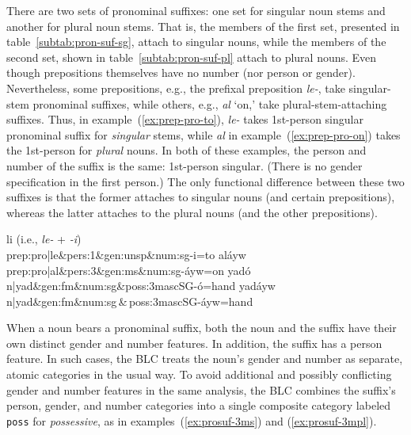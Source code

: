 {\begin{description}
There are two sets
of pronominal suffixes: one set for singular noun stems and another for plural noun stems. 
That is, the members of the first set, presented in table~\ref{subtab:pron-suf-sg}, 
attach to singular nouns, while the members of the second set, shown in table~\ref{subtab:pron-suf-pl} 
attach to plural nouns. 
Even though prepositions themselves have no number (nor person or gender). 
Nevertheless, some prepositions, e.g., the prefixal preposition \textit{le-}, 
take singular-stem pronominal suffixes, while others, e.g., \textit{al} `on,'
take plural-stem-attaching suffixes. Thus, in example~(\ref{ex:prep-pro-to}), 
\textit{le-} takes 1st-person singular pronominal suffix for \emph{singular} stems, 
while \textit{al} in example~(\ref{ex:prep-pro-on}) takes the 1st-person 
for \emph{plural} nouns. In both of these examples, the person and number of 
the suffix is the same: 1st-person singular. (There is no gender specification in the first person.)
The only functional difference between these two suffixes is that the former 
attaches to singular nouns (and certain prepositions), whereas the latter 
attaches to the plural nouns (and the other prepositions). 
\begin{exe}
{\selectfont \small
\ex \label{ex:prep-pro-to}
li \qquad \textrm{(i.e., \textit{le-} + \textit{-i})} \\
prep:pro|le\&pers:1\&gen:unsp\&num:sg-i=to
}
\ex \label{ex:prep-pro-on}
{\selectfont \small
{}al\'{a}yw  \\
prep:pro|al\&pers:3\&gen:ms\&num:sg-\'{a}yw=on
}
\ex \label{ex:prosuf-3ms}
{\selectfont \small
yad\'{o} \\
n|yad\&gen:fm\&num:sg\&poss:3mascSG-\'{o}=hand
}
\ex \label{ex:prosuf-3mpl}
{\selectfont \small
yad\'{a}yw \\
n|yad\&gen:fm\&num:sg\,\&\,poss:3mascSG-\'{a}yw=hand
}
\end{exe}

When a noun bears a pronominal suffix, both the noun and the suffix have their 
own distinct gender and number features. In addition, the suffix has a person feature. 
In such cases, the BLC treats the noun's gender and number as separate, atomic
categories in the usual way. To avoid additional and possibly conflicting gender 
and number features in the same
analysis, the BLC combines the suffix's person, gender, and number categories into 
a single composite category labeled \texttt{poss} for \textit{possessive}, as in 
examples~(\ref{ex:prosuf-3ms}) and (\ref{ex:prosuf-3mpl}).


\end{description}}
